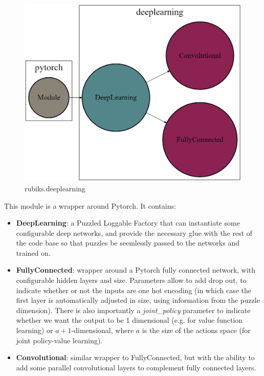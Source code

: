 \begin{figure}[H]
\centering
\includegraphics[scale=0.22]{./Figures/codebasedeeplearning}
\caption[Codebase]{rubiks.deeplearning}
\label{fig:Codebasedeeplearning}
\end{figure}
This module is a wrapper around Pytorch. It contains:
\begin{itemize}
\item \textbf{DeepLearning}: a Puzzled Loggable Factory that can instantiate some configurable deep networks, and provide the necessary glue with the rest of the code base so that puzzles be seemlessly passed to the networks and trained on. 
\item \textbf{FullyConnected}: wrapper around a Pytorch fully connected network, with configurable hidden layers and size. Parameters allow to add drop out, to indicate whether or not the inputs are one hot encoding (in which case the first layer is automatically adjusted in size, using information from the puzzle dimension). There is also importantly a \textit{joint\_policy} parameter to indicate whether we want the output to be 1 dimensional (e.g. for value function learning) or $a+1$-dimensional, where $a$ is the size of the actions space (for joint policy-value learning).
\item \textbf{Convolutional}: similar wrapper to FullyConnected, but with the ability to add some parallel convolutional layers to complement fully connected layers.
\end{itemize}


